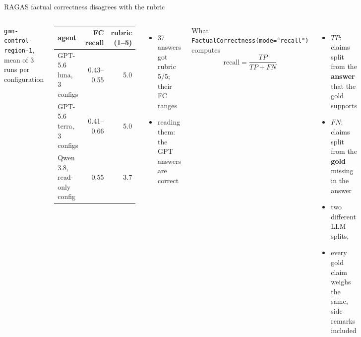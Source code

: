 
\begin{frame}{RAGAS factual correctness disagrees with the rubric}
  \vspace{2pt}
  \begin{columns}[T]
    \small \texttt{gmn-control-region-1}, mean of 3 runs per configuration
    \vspace{4pt}
    \begin{center}
    \begin{tabular}{lrr}
      \toprule
      agent & FC recall & rubric (1--5) \\
      \midrule
      GPT-5.6 luna, 3 configs  & 0.43--0.55 & 5.0 \\
      GPT-5.6 terra, 3 configs & 0.41--0.66 & 5.0 \\
      Qwen 3.8, read-only config & 0.55 & 3.7 \\
      \bottomrule
    \end{tabular}
    \end{center}
    \small
    \begin{itemize}
      \item 37 answers got rubric 5/5; their FC ranges 
      \item reading them: the GPT answers are correct
    \end{itemize}
    \small What \texttt{FactualCorrectness(mode="recall")} computes\\
    \[
      \text{recall}=\frac{TP}{TP+FN}
    \]
    \begin{itemize}
      \item $TP$: claims split from the \textbf{answer} that the gold supports
      \item $FN$: claims split from the \textbf{gold} missing in the answer
      \item two different LLM splits, 
      \item every gold claim weighs the same, side remarks included\\
    \end{itemize}
  \end{columns}
\end{frame}

